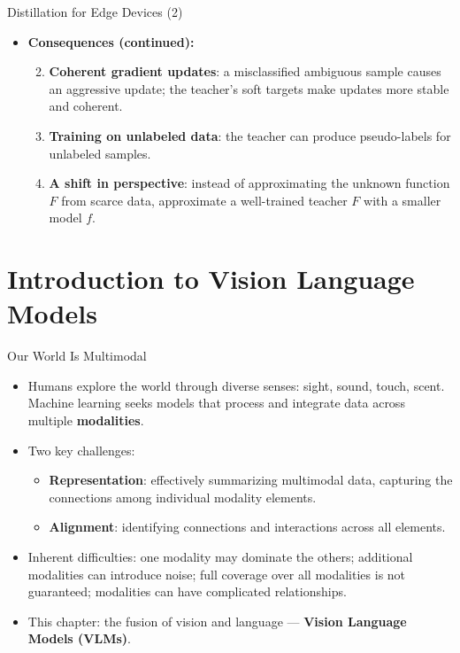 \begin{frame}{Distillation for Edge Devices (2)}
\begin{itemize}
  \item \textbf{Consequences (continued):}
  \begin{enumerate}
    \setcounter{enumi}{1}
    \item \textbf{Coherent gradient updates}: a misclassified ambiguous sample causes an aggressive update; the teacher's soft targets make updates more stable and coherent.
    \item \textbf{Training on unlabeled data}: the teacher can produce pseudo-labels for unlabeled samples.
    \item \textbf{A shift in perspective}: instead of approximating the unknown function $F$ from scarce data, approximate a well-trained teacher $F$ with a smaller model $f$.
  \end{enumerate}
\end{itemize}
\end{frame}

\section{Introduction to Vision Language Models}

\begin{frame}{Our World Is Multimodal}
\begin{itemize}
  \item Humans explore the world through diverse senses: sight, sound, touch, scent. Machine learning seeks models that process and integrate data across multiple \textbf{modalities}.
  \item Two key challenges:
  \begin{itemize}
    \item \textbf{Representation}: effectively summarizing multimodal data, capturing the connections among individual modality elements.
    \item \textbf{Alignment}: identifying connections and interactions across all elements.
  \end{itemize}
  \item Inherent difficulties: one modality may dominate the others; additional modalities can introduce noise; full coverage over all modalities is not guaranteed; modalities can have complicated relationships.
  \item This chapter: the fusion of vision and language --- \textbf{Vision Language Models (VLMs)}.
\end{itemize}
\end{frame}


